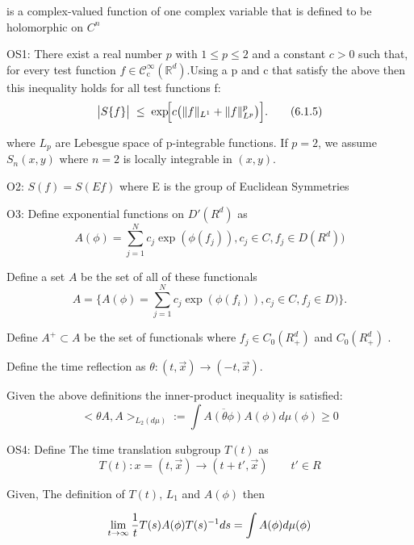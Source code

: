 \documentclass{article}
\newcommand{\1}{\mathbbm{1}}
\theoremstyle{plain}
\theoremstyle{definition}
\numberwithin{equation}{section}
\begin{document}
is a complex-valued function of one complex variable that is defined to be holomorphic on $C^n$ 

OS1:
There exist a real number \(p\) with \(1\le p\le 2\) and a constant \(c>0\) such that, for every test function \(f\in\mathcal{C}^{\infty}_{\mathrm c}(\mathbb{R}^{d})\).Using a p and c that satisfy the above then this inequality holds for all test functions f:
\begin{equation}\label{eq:OS1}
\bigl|S\{f\}\bigr|
\;\le\;
\exp\!\Bigl[c\bigl(\|f\|_{L^{1}}+\|f\|_{L^{p}}^p\bigr)\Bigr].
\tag{6.1.5}
\end{equation}

where $L_p$ are Lebesgue space of p-integrable functions.
If \(p=2\), we assume $S_n(x,y)$ where $n=2$ is locally integrable in $(x,y)$.

 O2: $S(f)= S(Ef)$ where E is the group of Euclidean Symmetries

 O3: Define exponential functions on $D'(R^d)$ as
    \begin{equation}
         A(\phi)= \sum_{j=1}^N c_j \exp (\phi(f_j)), c_j \in C, f_j \in D(R^d))
    \end{equation}

Define a set $A$ be the set of all of these functionals
      \begin{equation}
        A = \{ A(\phi)= \sum_{j=1}^N c_j \exp (\phi(f_i)), c_j \in C, f_j \in D)\}.
    \end{equation}
     

   Define $A^+ \subset  A $ be the set of functionals where $f_j \in C_0(R_{+}^d)$ and $C_0(R_{+}^d)$ .
   
   Define the time reflection as $\theta: (t , \vec{x}) \rightarrow (-t, \vec{x})$. 
   
   Given the above definitions the inner-product inequality is satisfied:  
     \begin{equation}
         < \theta A, A >_{L_2(d \mu)}:= \int \overline{A(\theta \phi)} A(\phi) d \mu(\phi)\geq 0 
     \end{equation}
     
   OS4: 
   Define The time translation subgroup $T(t)$ as 
    \begin{equation}
        T(t) : x = (t, \vec{x})\rightarrow (t+ t', \vec{x}) \qquad t'\in R 
    \end{equation}


Given, The definition of $T(t)$, $L_1$ and $A(\phi)$ then 

\begin{equation}
    \lim_{t \rightarrow \infty} {1 \over t} T(s) A(\phi) T(s)^{-1} ds = \int A (\phi) d \mu(\phi)
\end{equation}
\end{document}
